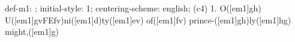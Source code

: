 def-m1: \grealign;
initial-style: 1;
centering-scheme: english;
(c4) 1. O([em1]gh) U([em1]gvFEfv)ni([em1]d)ty([em1]ev) of([em1]fv) prince-([em1]gh)ly([em1]hg) might,([em1]g)